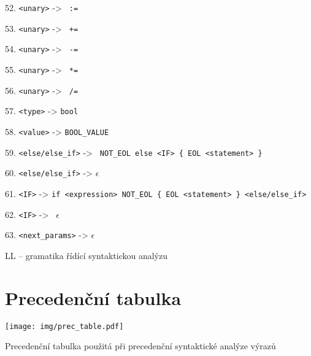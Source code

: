 \documentclass[a4paper, 11pt]{article}
\begin{document}
\begin{flushleft}
	52. \texttt{<unary>} -> \texttt{ := }

	53. \texttt{<unary>} -> \texttt{ += }

	54. \texttt{<unary>} -> \texttt{ -= }

	55. \texttt{<unary>} -> \texttt{ *= }

	56. \texttt{<unary>} -> \texttt{ /= }

	57. \texttt{<type>} -> \texttt{bool}

	58. \texttt{<value>} -> \texttt{BOOL\_VALUE}

	59. \texttt{<else/else\_if>} -> \texttt{ NOT\_EOL else <IF> \{ EOL <statement> \} }

	60. \texttt{<else/else\_if>} -> \texttt{$\epsilon$}

	61. \texttt{<IF>} -> \texttt{if <expression> NOT\_EOL \{ EOL <statement> \} <else/else\_if> }

	62. \texttt{<IF>} -> \texttt{ $\epsilon$ }

	63. \texttt{<next\_params>} -> \texttt{$\epsilon$}
	
	
	   
		
\end{flushleft} 

	\begin{table}[!ht]
	\centering
	 \caption{LL -- gramatika řídící syntaktickou analýzu}
		\label{table:ll_gramatika}
	\end{table}

\section{Precedenční tabulka}



	\begin{table}[!ht]
		\centering
		\texttt{[image: img/prec\_table.pdf]}
		\caption{Precedenční tabulka použitá při precedenční syntaktické analýze výrazů}
		\label{table:prec_table}
	\end{table}
	
\end{document}
